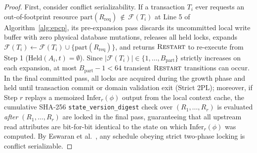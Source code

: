 \documentclass[conference,10pt]{IEEEtran}
\begin{document}
\begin{proof}
First, consider conflict serializability. If a transaction $T_i$ ever requests an out-of-footprint resource $\text{part}(R_{\text{req}}) \,\notin\, \mathcal{F}(T_i)$ at Line 5 of Algorithm~\ref{alg:epcp}, its pre-expansion pass discards its uncommitted local write buffer with zero physical database mutations, releases all held locks, expands $\mathcal{F}(T_i) \leftarrow \mathcal{F}(T_i) \cup \{\text{part}(R_{\text{req}})\}$, and returns $\textsc{Restart}$ to re-execute from Step 1 ($\text{Held}(A_i, t) = \emptyset$). Since $|\mathcal{F}(T_i)| \in \{1, \dots, B_{\text{part}}\}$ strictly increases on each expansion, at most $B_{\text{part}} - 1 < 64$ transient $\textsc{Restart}$ transitions can occur. In the final committed pass, all locks are acquired during the growth phase and held until transaction commit or domain validation exit (Strict 2PL); moreover, if Step $r$ replays a memoized $\text{Infer}_r(\phi)$ output from the local context cache, the cumulative SHA-256 \texttt{state\_version\_digest} check over $(R_1, \dots, R_r)$ is evaluated \textit{after} $(R_1, \dots, R_r)$ are locked in the final pass, guaranteeing that all upstream read attributes are bit-for-bit identical to the state on which $\text{Infer}_r(\phi)$ was computed. By Eswaran et al.~\cite{eswaran1976notions}, any schedule obeying strict two-phase locking is conflict serializable.


\end{proof}
\end{document}
